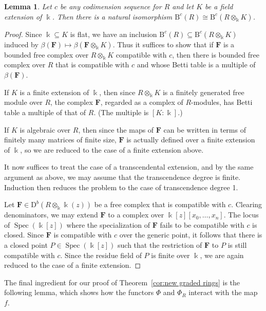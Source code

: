 \documentclass[12pt]{amsart}
\newtheorem{lemma}{Lemma}[section]
\theoremstyle{definition}
\theoremstyle{remark}
\newcommand{\Spec}{\operatorname{Spec}}
\newcommand{\kk}{\Bbbk}
\newcommand{\cc}{c}
\newcommand{\FF}{\mathbf{F}}
\newcommand{\DD}{\mathrm{D}}
\newcommand{\BBQ}{\mathrm{B}}
\begin{document}
\begin{lemma}\label{lem:ground field}
Let $\cc$ be any codimension sequence for $R$ and let $K$ be a field extension of $\kk$.  Then there is a natural isomorphism $\BBQ^{\cc}(R)\cong\BBQ^{\cc}(R\otimes_{\kk}K)$.
\end{lemma}
\begin{proof}
Since $\kk\subseteq K$ is flat, we have an inclusion $\BBQ^{\cc}(R)\subseteq\BBQ^{\cc}(R\otimes_{\kk}K)$ induced by $\beta(\FF)\mapsto \beta(\FF\otimes_{\kk} K)$. Thus it suffices to
show that if $\FF$ is a bounded free complex over $R\otimes_{\kk}K$ compatible with $\cc$,
 then there is bounded free complex over $R$ that is compatible with $\cc$ and whose
 Betti table is a multiple of $\beta(\FF)$.
 
If $K$ is a finite extension of $\kk$, then since $R\otimes_{\kk}K$ is a finitely generated 
free module over $R$, the complex $\FF$, regarded as a complex of $R$-modules,
has Betti table a multiple of that of $R$.  (The multiple is $[K:\kk].$)

If $K$ is algebraic over $R$, then since the maps of $\FF$ can be written in terms of finitely
many matrices of finite size, $\FF$ is actually defined over a finite extension of $\kk$, so we
are reduced to the case of a finite extension above.

It now suffices to treat the case of a transcendental extension, and by the same argument as
above, we may assume that the transcendence degree is finite. Induction then reduces the
problem to the case of transcendence degree 1.

Let $\FF\in \DD^b(R\otimes_{\kk}\kk(z))$ be a free complex that is compatible with $\cc$.  Clearing denominators, we may extend $\FF$ to a complex over $\kk[z][x_0,\dots,x_n]$.  The locus of $\Spec(\kk[z])$ where the specialization of $\FF$ fails to be compatible with $\cc$ is  closed.  Since $\FF$ is compatible with $\cc$ over the generic point, it follows that there is a closed point $P\in \Spec(\kk[z])$ such that the restriction of $\FF$ to $P$ is still compatible with $\cc$.  Since the residue field of $P$ is finite over $\kk$, we are again reduced to the case of a finite extension.\end{proof}

The final ingredient for our proof of Theorem~\ref{cor:new graded rings} is the following lemma, which shows how the functors $\Phi$ and $\Phi_{R}$ interact with the map $f$.
\end{document}
